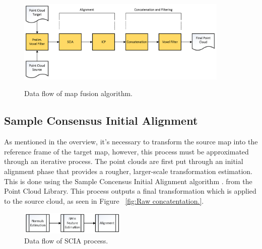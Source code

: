 \documentclass[letterpaper, oneside, 10pt]{report}
\begin{document}
\begin{figure}[h!]
 \caption{Data flow of map fusion algorithm.}
 \centering
   \includegraphics[width=0.9\textwidth]{images/mapfusion}
 \label{fig: map fusion.}
\end{figure}

    \subsection{Sample Consensus Initial Alignment}

    \noindent As mentioned in the overview, it's necessary to transform the source map into the reference frame of the target map, however, this process must be approximated through an iterative process. The point clouds are first put through an initial alignment phase that provides a rougher, larger-scale transformation estimation. This is done using the Sample Concensus Initial Alignment algorithm \cite{rusu2009fast}. from the Point Cloud Library. This process outputs a final transformation which is applied to the source cloud, as seen in Figure ~\ref{fig:Raw concatentation.}.

    \begin{figure}[h]
     \caption{Data flow of SCIA process.}
     \centering
       \includegraphics[width=0.45\textwidth]{images/initialalignment}
    \end{figure}
\end{document}
